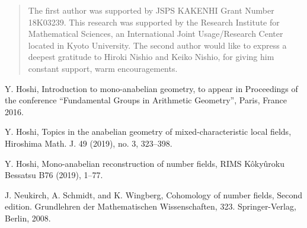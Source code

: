\documentclass[11pt,showkeys]{article}
\theoremstyle{theorem}
\theoremstyle{definition}
\begin{document}
\renewcommand{\abstractname}{Acknowledgements}
\begin{abstract}
The first author was supported by JSPS KAKENHI Grant Number 18K03239.  
This research was supported by the Research Institute for Mathematical 
Sciences, an International Joint Usage/Research Center located in Kyoto 
University. The second author would like to express a deepest gratitude to Hiroki Nishio and Keiko Nishio, for giving him constant support, warm encouragements. 
\end{abstract}

\begin{thebibliography}{99}

Y. Hoshi, Introduction to mono-anabelian geometry, to appear in Proceedings of the conference ``Fundamental Groups in Arithmetic Geometry'', Paris, France 2016.

Y. Hoshi, Topics in the anabelian geometry of mixed-characteristic local fields, Hiroshima Math. J. 49 (2019), no. 3, 323–398.

Y. Hoshi, Mono-anabelian reconstruction of number fields, RIMS K\^oky\^uroku Bessatsu B76 (2019), 1--77.

J. Neukirch, A. Schmidt, and K. Wingberg, Cohomology of number fields, Second edition.
Grundlehren der Mathematischen Wissenschaften, 323. Springer-Verlag, Berlin, 2008.

\end{thebibliography}
\end{document}
